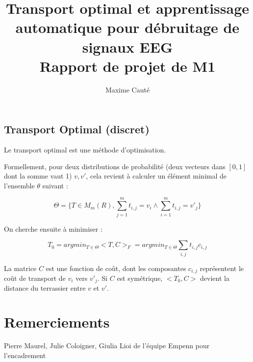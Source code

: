 \documentclass[a4paper]{article}
\begin{document}
\title{Transport optimal et apprentissage automatique pour débruitage de signaux EEG \\
			Rapport de projet de M1}
\author{Maxime Cauté}


\maketitle

\subsection{Transport Optimal (discret)}

Le transport optimal est une méthode d'optimisation.

Formellement, pour deux distributions de probabilité (deux vecteurs dans $[0,1]$ dont la somme vaut 1) $v, v'$, cela revient à calculer un élément minimal de l'ensemble $\theta$ suivant :

	$$ \Theta = \{ T \in M_m(R), \sum_{j=1}^m t_{i,j} = v_i \wedge \sum_{i=1}^m t_{i,j} = v'_j\}$$

On cherche ensuite à minimiser :

	$$ T_0 = argmin_{T \in \Theta} <T, C>_F = argmin_{T \in \Theta} \sum_{i,j} t_{i,j}c_{i,j} $$
	
La matrice $C$ est une fonction de coût, dont les composantes $c_{i,j}$ représentent le coût de transport de $v_i$ vers $v'_j$. Si $C$ est symétrique, $<T_0,C>$ devient la distance du terrassier entre $v$ et $v'$.
	



\section*{Remerciements}

Pierre Maurel, Julie Coloigner, Giulia Lioi de l'équipe Empenn pour l'encadrement
\end{document}

